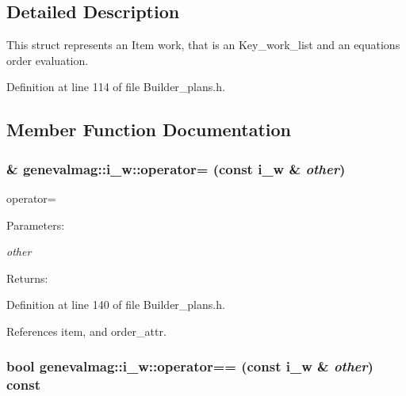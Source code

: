 \subsection{Detailed Description}
This struct represents an Item work, that is an Key\_\-work\_\-list and an equations order evaluation. 

Definition at line 114 of file Builder\_\-plans.h.

\subsection{Member Function Documentation}
\hypertarget{structgenevalmag_1_1i__w_b769b7c451b0e1c4d2cb36eba15f99ab}{
\subsubsection[{operator=}]{\& genevalmag::i\_\-w::operator= (const {\bf i\_\-w} \& {\em other})}}
\label{structgenevalmag_1_1i__w_b769b7c451b0e1c4d2cb36eba15f99ab}


operator= \begin{Desc}
\item[Parameters:]
\begin{description}
\item[{\em other}]\end{description}
\end{Desc}
\begin{Desc}
\item[Returns:]\end{Desc}


Definition at line 140 of file Builder\_\-plans.h.

References item, and order\_\-attr.\hypertarget{structgenevalmag_1_1i__w_c382c0ff3ab5b4ae50512a64ec16ae5d}{
\subsubsection[{operator==}]{\setlength{\rightskip}{0pt plus 5cm}bool genevalmag::i\_\-w::operator== (const {\bf i\_\-w} \& {\em other}) const}}
\label{structgenevalmag_1_1i__w_c382c0ff3ab5b4ae50512a64ec16ae5d}


